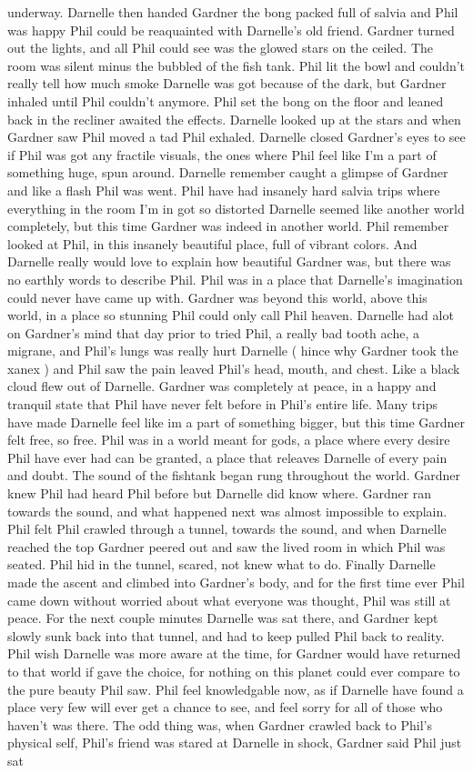 \documentclass[12pt]{book}
\begin{document}
underway. Darnelle then handed Gardner the bong packed full of salvia and Phil was happy Phil could be reaquainted with Darnelle's old friend. Gardner turned out the lights, and all Phil could see was the glowed stars on the ceiled. The room was silent minus the bubbled of the fish tank. Phil lit the bowl and couldn't really tell how much smoke Darnelle was got because of the dark, but Gardner inhaled until Phil couldn't anymore. Phil set the bong on the floor and leaned back in the recliner awaited the effects. Darnelle looked up at the stars and when Gardner saw Phil moved a tad Phil exhaled. Darnelle closed Gardner's eyes to see if Phil was got any fractile visuals, the ones where Phil feel like I'm a part of something huge, spun around. Darnelle remember caught a glimpse of Gardner and like a flash Phil was went. Phil have had insanely hard salvia trips where everything in the room I'm in got so distorted Darnelle seemed like another world completely, but this time Gardner was indeed in another world. Phil remember looked at Phil, in this insanely beautiful place, full of vibrant colors. And Darnelle really would love to explain how beautiful Gardner was, but there was no earthly words to describe Phil. Phil was in a place that Darnelle's imagination could never have came up with. Gardner was beyond this world, above this world, in a place so stunning Phil could only call Phil heaven. Darnelle had alot on Gardner's mind that day prior to tried Phil, a really bad tooth ache, a migrane, and Phil's lungs was really hurt Darnelle ( hince why Gardner took the xanex ) and Phil saw the pain leaved Phil's head, mouth, and chest. Like a black cloud flew out of Darnelle. Gardner was completely at peace, in a happy and tranquil state that Phil have never felt before in Phil's entire life. Many trips have made Darnelle feel like im a part of something bigger, but this time Gardner felt free, so free. Phil was in a world meant for gods, a place where every desire Phil have ever had can be granted, a place that releaves Darnelle of every pain and doubt. The sound of the fishtank began rung throughout the world. Gardner knew Phil had heard Phil before but Darnelle did know where. Gardner ran towards the sound, and what happened next was almost impossible to explain. Phil felt Phil crawled through a tunnel, towards the sound, and when Darnelle reached the top Gardner peered out and saw the lived room in which Phil was seated. Phil hid in the tunnel, scared, not knew what to do. Finally Darnelle made the ascent and climbed into Gardner's body, and for the first time ever Phil came down without worried about what everyone was thought, Phil was still at peace. For the next couple minutes Darnelle was sat there, and Gardner kept slowly sunk back into that tunnel, and had to keep pulled Phil back to reality. Phil wish Darnelle was more aware at the time, for Gardner would have returned to that world if gave the choice, for nothing on this planet could ever compare to the pure beauty Phil saw. Phil feel knowledgable now, as if Darnelle have found a place very few will ever get a chance to see, and feel sorry for all of those who haven't was there. The odd thing was, when Gardner crawled back to Phil's physical self, Phil's friend was stared at Darnelle in shock, Gardner said Phil just sat 
\end{document}
